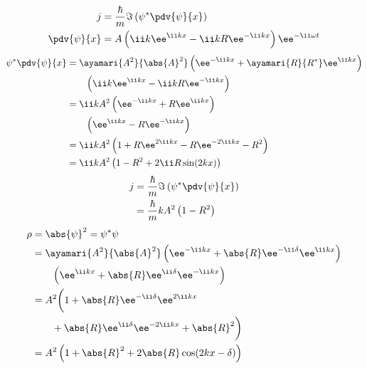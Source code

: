 \begin{align*}
j&=\frac{\hbar}{m}\Im\left(\psi^{*}\pdv{\psi}{x}\right)\\
\pdv{\psi}{x}&=A\left(\ii k\ee^{\ii kx}-\ii kR\ee^{-\ii kx}\right)\ee^{-\ii\omega t}
\end{align*}
\begin{align*}
\psi^{*}\pdv{\psi}{x}&=\ayamari{A^{2}}{\abs{A}^{2}}\left(\ee^{-\ii kx}+\ayamari{R}{R^{*}}\ee^{\ii kx}\right)\\
&\qquad\left(\ii k\ee^{\ii kx}-\ii kR\ee^{-\ii kx}\right)\\
&=\ii kA^{2}\left(\ee^{-\ii kx}+R\ee^{\ii kx}\right)\\
&\qquad\left(\ee^{\ii kx}-R\ee^{-\ii kx}\right)\\
&=\ii kA^{2}\left(1+R\ee^{2\ii kx}-R\ee^{-2\ii kx}-R^{2}\right)\\
&=\ii kA^{2}\left(1-R^{2}+2\ii R\sin(2kx)\right)
\end{align*}
\begin{align*}
j&=\frac{\hbar}{m}\Im\left(\psi^{*}\pdv{\psi}{x}\right)\\
&=\frac{\hbar}{m}kA^{2}\left(1-R^{2}\right)
\end{align*}
\begin{align*}
\rho&=\abs{\psi}^{2}=\psi^{*}\psi\\
&=\ayamari{A^{2}}{\abs{A}^{2}}\left(\ee^{-\ii kx}+\abs{R}\ee^{-\ii\delta}\ee^{\ii kx}\right)\\
&\qquad\left(\ee^{\ii kx}+\abs{R}\ee^{\ii\delta}\ee^{-\ii kx}\right)\\
&=A^{2}\biggl(1+\abs{R}\ee^{-\ii\delta}\ee^{2\ii kx}\\
&\qquad+\abs{R}\ee^{\ii\delta}\ee^{-2\ii kx}+\abs{R}^{2}\biggr)\\
&=A^{2}\left(1+\abs{R}^{2}+2\abs{R}\cos(2kx-\delta)\right)
\end{align*}
